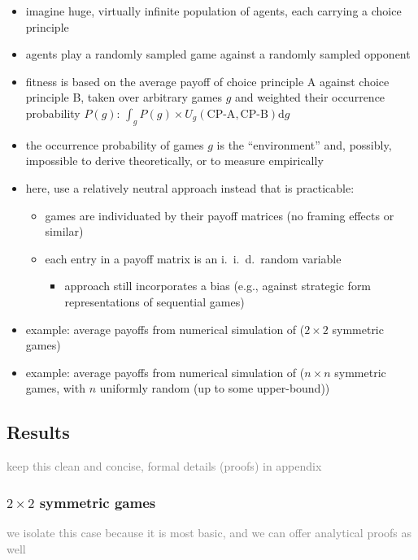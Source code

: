 \documentclass[fleqn,reqno,11pt]{article}
\begin{document}
\begin{itemize}
\item imagine huge, virtually infinite population of agents, each carrying a choice principle
\item agents play a randomly sampled game against a randomly sampled opponent
\item fitness is based on the average payoff of choice principle A against choice principle B,
  taken over arbitrary games $g$ and weighted their occurrence probability $P(g)$:
  $\int_g P(g) \times U_g(\text{CP-A}, \text{CP-B}) \text{d}g$
\item the occurrence probability of games $g$ is the ``environment'' and, possibly, impossible to
  derive theoretically, or to measure empirically
\item here, use a relatively neutral approach instead that is practicable:
  \begin{itemize}
  \item games are individuated by their payoff matrices (no framing effects or similar)
  \item each entry in a payoff matrix is an i.~i.~d.~random variable
    \begin{itemize}
    \item approach still incorporates a bias (e.g., against strategic form representations of
      sequential games)
    \end{itemize}
  \end{itemize}
\item example: average payoffs from numerical simulation of ($2 \times 2$ symmetric games)
\item example: average payoffs from numerical simulation of ($n \times n$ symmetric games, with
  $n$ uniformly random (up to some upper-bound))
\end{itemize}

\subsection{Results}

\textcolor{gray}{keep this clean and concise, formal details (proofs) in appendix}

\subsubsection{$2 \times 2$ symmetric games}

\textcolor{gray}{we isolate this case because it is most basic, and we can offer analytical
  proofs as well}
\end{document}
